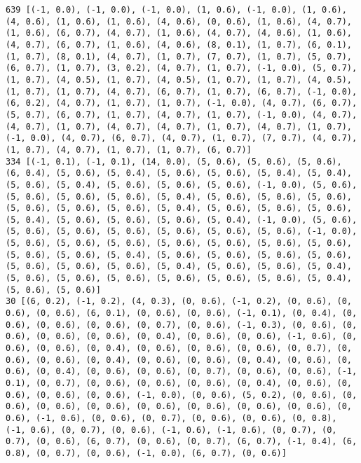 \documentclass[11pt]{article}
\begin{document}
\begin{Verbatim}[commandchars=\\\{\}]
639 [(-1, 0.0), (-1, 0.0), (-1, 0.0), (1, 0.6), (-1, 0.0), (1, 0.6), (4, 0.6), (1, 0.6), (1, 0.6), (4, 0.6), (0, 0.6), (1, 0.6), (4, 0.7), (1, 0.6), (6, 0.7), (4, 0.7), (1, 0.6), (4, 0.7), (4, 0.6), (1, 0.6), (4, 0.7), (6, 0.7), (1, 0.6), (4, 0.6), (8, 0.1), (1, 0.7), (6, 0.1), (1, 0.7), (8, 0.1), (4, 0.7), (1, 0.7), (7, 0.7), (1, 0.7), (5, 0.7), (6, 0.7), (1, 0.7), (3, 0.2), (4, 0.7), (1, 0.7), (-1, 0.0), (5, 0.7), (1, 0.7), (4, 0.5), (1, 0.7), (4, 0.5), (1, 0.7), (1, 0.7), (4, 0.5), (1, 0.7), (1, 0.7), (4, 0.7), (6, 0.7), (1, 0.7), (6, 0.7), (-1, 0.0), (6, 0.2), (4, 0.7), (1, 0.7), (1, 0.7), (-1, 0.0), (4, 0.7), (6, 0.7), (5, 0.7), (6, 0.7), (1, 0.7), (4, 0.7), (1, 0.7), (-1, 0.0), (4, 0.7), (4, 0.7), (1, 0.7), (4, 0.7), (4, 0.7), (1, 0.7), (4, 0.7), (1, 0.7), (-1, 0.0), (4, 0.7), (6, 0.7), (4, 0.7), (1, 0.7), (7, 0.7), (4, 0.7), (1, 0.7), (4, 0.7), (1, 0.7), (1, 0.7), (6, 0.7)]
334 [(-1, 0.1), (-1, 0.1), (14, 0.0), (5, 0.6), (5, 0.6), (5, 0.6), (6, 0.4), (5, 0.6), (5, 0.4), (5, 0.6), (5, 0.6), (5, 0.4), (5, 0.4), (5, 0.6), (5, 0.4), (5, 0.6), (5, 0.6), (5, 0.6), (-1, 0.0), (5, 0.6), (5, 0.6), (5, 0.6), (5, 0.6), (5, 0.4), (5, 0.6), (5, 0.6), (5, 0.6), (5, 0.6), (5, 0.6), (5, 0.6), (5, 0.4), (5, 0.6), (5, 0.6), (5, 0.6), (5, 0.4), (5, 0.6), (5, 0.6), (5, 0.6), (5, 0.4), (-1, 0.0), (5, 0.6), (5, 0.6), (5, 0.6), (5, 0.6), (5, 0.6), (5, 0.6), (5, 0.6), (-1, 0.0), (5, 0.6), (5, 0.6), (5, 0.6), (5, 0.6), (5, 0.6), (5, 0.6), (5, 0.6), (5, 0.6), (5, 0.6), (5, 0.4), (5, 0.6), (5, 0.6), (5, 0.6), (5, 0.6), (5, 0.6), (5, 0.6), (5, 0.6), (5, 0.4), (5, 0.6), (5, 0.6), (5, 0.4), (5, 0.6), (5, 0.6), (5, 0.6), (5, 0.6), (5, 0.6), (5, 0.6), (5, 0.4), (5, 0.6), (5, 0.6)]
30 [(6, 0.2), (-1, 0.2), (4, 0.3), (0, 0.6), (-1, 0.2), (0, 0.6), (0, 0.6), (0, 0.6), (6, 0.1), (0, 0.6), (0, 0.6), (-1, 0.1), (0, 0.4), (0, 0.6), (0, 0.6), (0, 0.6), (0, 0.7), (0, 0.6), (-1, 0.3), (0, 0.6), (0, 0.6), (0, 0.6), (0, 0.6), (0, 0.4), (0, 0.6), (0, 0.6), (-1, 0.6), (0, 0.6), (0, 0.6), (0, 0.4), (0, 0.6), (0, 0.6), (0, 0.6), (0, 0.7), (0, 0.6), (0, 0.6), (0, 0.4), (0, 0.6), (0, 0.6), (0, 0.4), (0, 0.6), (0, 0.6), (0, 0.4), (0, 0.6), (0, 0.6), (0, 0.7), (0, 0.6), (0, 0.6), (-1, 0.1), (0, 0.7), (0, 0.6), (0, 0.6), (0, 0.6), (0, 0.4), (0, 0.6), (0, 0.6), (0, 0.6), (0, 0.6), (-1, 0.0), (0, 0.6), (5, 0.2), (0, 0.6), (0, 0.6), (0, 0.6), (0, 0.6), (0, 0.6), (0, 0.6), (0, 0.6), (0, 0.6), (0, 0.6), (-1, 0.6), (0, 0.6), (0, 0.7), (0, 0.6), (0, 0.6), (0, 0.8), (-1, 0.6), (0, 0.7), (0, 0.6), (-1, 0.6), (-1, 0.6), (0, 0.7), (0, 0.7), (0, 0.6), (6, 0.7), (0, 0.6), (0, 0.7), (6, 0.7), (-1, 0.4), (6, 0.8), (0, 0.7), (0, 0.6), (-1, 0.0), (6, 0.7), (0, 0.6)]

\end{Verbatim}
\end{document}

